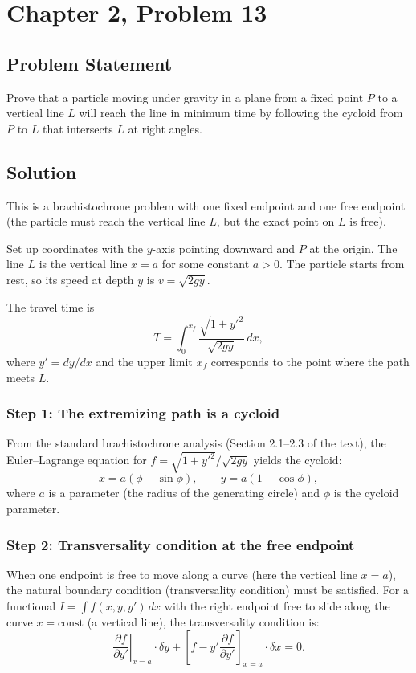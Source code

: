 \documentclass[12pt]{article}
\begin{document}
\section*{Chapter 2, Problem 13}

\subsection*{Problem Statement}
Prove that a particle moving under gravity in a plane from a fixed point $P$ to a vertical line $L$ will reach the line in minimum time by following the cycloid from $P$ to $L$ that intersects $L$ at right angles.

\subsection*{Solution}

This is a brachistochrone problem with one fixed endpoint and one free endpoint (the particle must reach the vertical line $L$, but the exact point on $L$ is free).

Set up coordinates with the $y$-axis pointing downward and $P$ at the origin. The line $L$ is the vertical line $x = a$ for some constant $a > 0$. The particle starts from rest, so its speed at depth $y$ is $v = \sqrt{2gy}$.

The travel time is
\[
  T = \int_0^{x_f} \frac{\sqrt{1+y'^2}}{\sqrt{2gy}}\,dx,
\]
where $y' = dy/dx$ and the upper limit $x_f$ corresponds to the point where the path meets $L$.

\subsubsection*{Step 1: The extremizing path is a cycloid}

From the standard brachistochrone analysis (Section 2.1--2.3 of the text), the Euler--Lagrange equation for $f = \sqrt{1+y'^2}/\sqrt{2gy}$ yields the cycloid:
\[
  x = a(\phi - \sin\phi), \qquad y = a(1-\cos\phi),
\]
where $a$ is a parameter (the radius of the generating circle) and $\phi$ is the cycloid parameter.

\subsubsection*{Step 2: Transversality condition at the free endpoint}

When one endpoint is free to move along a curve (here the vertical line $x = a$), the natural boundary condition (transversality condition) must be satisfied. For a functional $I = \int f(x,y,y')\,dx$ with the right endpoint free to slide along the curve $x = \text{const}$ (a vertical line), the transversality condition is:
\[
  \left.\frac{\partial f}{\partial y'}\right|_{x=a} \cdot \delta y + \left[f - y'\frac{\partial f}{\partial y'}\right]_{x=a} \cdot \delta x = 0.
\]
\end{document}
